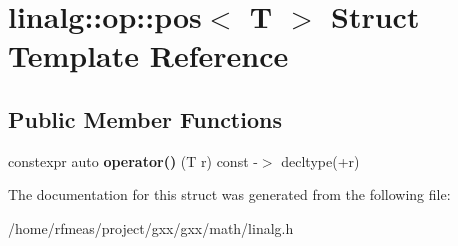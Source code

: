 \hypertarget{structlinalg_1_1op_1_1pos}{}\section{linalg\+:\+:op\+:\+:pos$<$ T $>$ Struct Template Reference}
\label{structlinalg_1_1op_1_1pos}
\subsection*{Public Member Functions}
\begin{DoxyCompactItemize}
\item 
constexpr auto {\bfseries operator()} (T r) const -\/$>$ decltype(+r)\hypertarget{structlinalg_1_1op_1_1pos_adba2cd27fbb8561a6b87f6e633a3ef01}{}\label{structlinalg_1_1op_1_1pos_adba2cd27fbb8561a6b87f6e633a3ef01}

\end{DoxyCompactItemize}


The documentation for this struct was generated from the following file\+:\begin{DoxyCompactItemize}
\item 
/home/rfmeas/project/gxx/gxx/math/linalg.\+h\end{DoxyCompactItemize}
